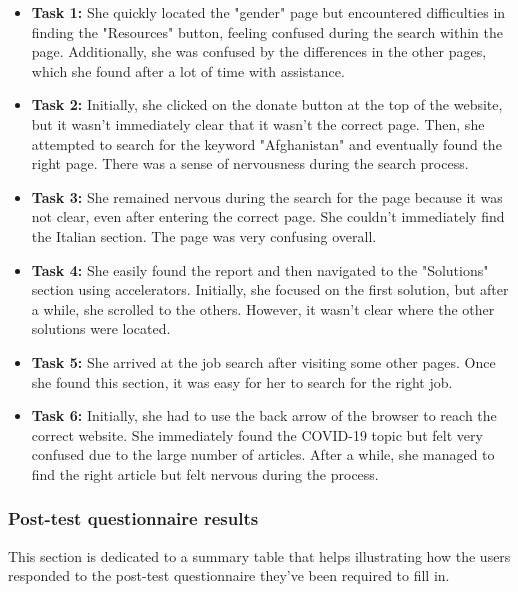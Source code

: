 \begin{itemize}
    \item \textbf{Task 1:} She quickly located the "gender" page but encountered difficulties in finding the "Resources" button, feeling confused during the search within the page. Additionally, she was confused by the differences in the other pages, which she found after a lot of time with assistance.
    \item \textbf{Task 2:} Initially, she clicked on the donate button at the top of the website, but it wasn't immediately clear that it wasn't the correct page. Then, she attempted to search for the keyword "Afghanistan" and eventually found the right page. There was a sense of nervousness during the search process.
    \item \textbf{Task 3:} She remained nervous during the search for the page because it was not clear, even after entering the correct page. She couldn't immediately find the Italian section. The page was very confusing overall.
    \item \textbf{Task 4:} She easily found the report and then navigated to the "Solutions" section using accelerators. Initially, she focused on the first solution, but after a while, she scrolled to the others. However, it wasn't clear where the other solutions were located.
    \item \textbf{Task 5:} She arrived at the job search after visiting some other pages. Once she found this section, it was easy for her to search for the right job.
    \item \textbf{Task 6:} Initially, she had to use the back arrow of the browser to reach the correct website. She immediately found the COVID-19 topic but felt very confused due to the large number of articles. After a while, she managed to find the right article but felt nervous during the process.
\end{itemize}


\clearpage




\subsubsection*{Post-test questionnaire results}
This section is dedicated to a summary table that helps illustrating how the users responded to the post-test questionnaire they've been required to fill in.\\

